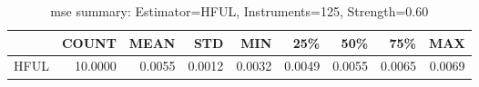 \begin{table}[ht]
\centering
\caption{mse summary: Estimator=HFUL, Instruments=125, Strength=0.60}
\begin{tabular}{lrrrrrrrr}
\toprule
 & COUNT & MEAN & STD & MIN & 25\% & 50\% & 75\% & MAX \\
\midrule
HFUL & 10.0000 & 0.0055 & 0.0012 & 0.0032 & 0.0049 & 0.0055 & 0.0065 & 0.0069 \\
\bottomrule
\end{tabular}
\end{table}
